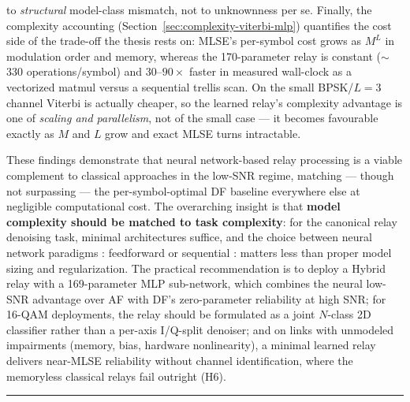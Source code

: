 \begin{itemize}
to \emph{structural} model-class mismatch, not to unknownness per se. Finally, the complexity accounting (Section~\ref{sec:complexity-viterbi-mlp}) quantifies the cost side of the trade-off the thesis rests on: MLSE's per-symbol cost grows as $M^{L}$ in modulation order and memory, whereas the 170-parameter relay is constant ($\sim$330 operations/symbol) and $30$--$90\times$ faster in measured wall-clock as a vectorized matmul versus a sequential trellis scan. On the small BPSK/$L{=}3$ channel Viterbi is actually cheaper, so the learned relay's complexity advantage is one of \emph{scaling and parallelism}, not of the small case --- it becomes favourable exactly as $M$ and $L$ grow and exact MLSE turns intractable.
\end{itemize}

These findings demonstrate that neural network-based relay processing is a viable complement to classical approaches in the low-SNR regime, matching --- though not surpassing --- the per-symbol-optimal DF baseline everywhere else at negligible computational cost. The overarching insight is that \textbf{model complexity should be matched to task complexity}: for the canonical relay denoising task, minimal architectures suffice, and the choice between neural network paradigms : feedforward or sequential : matters less than proper model sizing and regularization. The practical recommendation is to deploy a Hybrid relay with a 169-parameter MLP sub-network, which combines the neural low-SNR advantage over AF with DF's zero-parameter reliability at high SNR; for 16-QAM deployments, the relay should be formulated as a joint $N$-class 2D classifier rather than a per-axis I/Q-split denoiser; and on links with unmodeled impairments (memory, bias, hardware nonlinearity), a minimal learned relay delivers near-MLSE reliability without channel identification, where the memoryless classical relays fail outright (H6).

\begin{center}\rule{0.5\linewidth}{0.5pt}\end{center}

